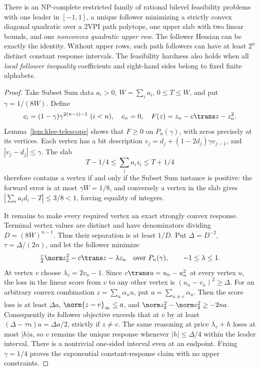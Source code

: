 \begin{theorem}
\label{thm:follower-path-hardness}
There is an NP-complete restricted family of rational bilevel feasibility
problems with one leader in \([-1,1]\), a unique follower minimizing a strictly
convex diagonal quadratic over a 2VPI path polytope, one upper slab with two
linear bounds, and one \emph{nonconvex quadratic upper row}. The follower
Hessian can be exactly the identity. Without upper rows, such path followers
can have at least \(2^n\) distinct constant response intervals.
The feasibility hardness also holds when all \emph{local follower inequality}
coefficients and right-hand sides belong to fixed finite alphabets.
\end{theorem}
\begin{proof}
Take Subset Sum data \(a_i>0\), \(W=\sum_i a_i\), \(0\le T\le W\), and put
\(\gamma=1/(8W)\). Define
\[
 c_i=(1-\gamma)\gamma^{2(n-i)-1}\ (i<n),\quad c_n=0,\quad
 F(z)=z_n-c\trans z-z_n^2.
\]
Lemma~\ref{lem:klee-telescope} shows that \(F\ge0\) on \(P_n(\gamma)\), with
zeros precisely at its vertices. Each vertex has a bit description
\(v_j=d_j+(1-2d_j)\gamma v_{j-1}\), and
\(|v_j-d_j|\le\gamma\). The slab
\begin{equation}\label{eq:klee-slab}
 T-1/4\le\sum_i a_i z_i\le T+1/4
\end{equation}
therefore contains a vertex if and only if the Subset Sum instance is positive:
the forward error is at most \(\gamma W=1/8\), and conversely a vertex in
the slab gives \(|\sum_i a_i d_i-T|\le3/8<1\), forcing equality of integers.

It remains to make every required vertex an exact strongly convex response.
Terminal vertex values are distinct and have denominators dividing
\(D=(8W)^{n-1}\). Thus their separation is at least \(1/D\). Put
\(\Delta=D^{-2}\), \(\tau=\Delta/(2n)\), and let the follower minimize
\begin{equation}\label{eq:klee-quadratic-follower}
 \tfrac\tau2\norm z_2^2-c\trans z-\lambda z_n
 \quad\text{over }P_n(\gamma),\qquad -1\le\lambda\le1.
\end{equation}
At vertex \(v\) choose \(\lambda_v=2v_n-1\). Since
\(c\trans u=u_n-u_n^2\) at every vertex \(u\), the loss in the linear score
from \(v\) to any other vertex is \((u_n-v_n)^2\ge\Delta\).
For an arbitrary convex combination \(z=\sum_u\alpha_u u\), put
\(a=\sum_{u\ne v}\alpha_u\). Then the score loss is at least \(\Delta a\),
\(\norm{z-v}_\infty\le a\), and
\(\norm z_2^2-\norm v_2^2\ge-2na\). Consequently its follower objective
exceeds that at \(v\) by at least \((\Delta-\tau n)a=\Delta a/2\), strictly
if \(z\ne v\). The same reasoning at price \(\lambda_v+h\) loses at most
\(|h|a\), so \(v\) remains the unique response whenever \(|h|\le\Delta/4\)
within the leader interval. There is a nontrivial one-sided interval even at
an endpoint. Fixing \(\gamma=1/4\) proves the exponential constant-response
claim with no upper constraints.


\end{proof}
